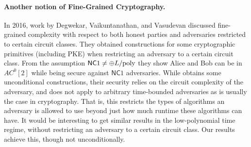 \paragraph{Another notion of Fine-Grained Cryptography.} In 2016, work by Degwekar, Vaikuntanathan, and Vasudevan \cite{DVV16} discussed fine-grained complexity with respect to both honest parties and adversaries restricted to certain circuit classes. They obtained constructions for some cryptographic primitives (including PKE) when restricting an adversary to a certain circuit class. From the assumption $\mathsf{NC}1 \neq \oplus L/{\rm poly}$ they show Alice and Bob can be in $AC^0[2]$ while being secure against $\mathsf{NC}1$ adversaries. While \cite{DVV16} obtains some unconditional constructions, their security relies on the circuit complexity of the adversary, and does not apply to arbitrary time-bounded adversaries as is usually the case in cryptography. That is, this restricts the types of algorithms an adversary is allowed to use beyond just how much runtime these algorithms can have. It would be interesting to get similar results in the low-polynomial time regime, without restricting an adversary to a certain circuit class. Our results achieve this, though not unconditionally.

